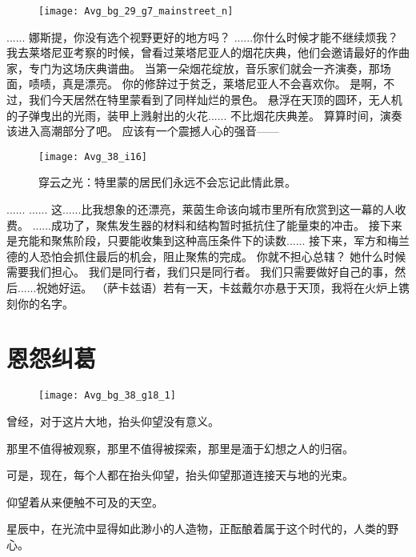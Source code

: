 \documentclass[openany]{book}
\begin{document}
\begin{figure}[h]
    \centering
    \texttt{[image: Avg\_bg\_29\_g7\_mainstreet\_n]}
\end{figure}
\begin{dialogue}
     ......
     娜斯提，你没有选个视野更好的地方吗？
     ......你什么时候才能不继续烦我？
     我去莱塔尼亚考察的时候，曾看过莱塔尼亚人的烟花庆典，他们会邀请最好的作曲家，专门为这场庆典谱曲。
     当第一朵烟花绽放，音乐家们就会一齐演奏，那场面，啧啧，真是漂亮。
     你的修辞过于贫乏，莱塔尼亚人不会喜欢你。
     是啊，不过，我们今天居然在特里蒙看到了同样灿烂的景色。
     悬浮在天顶的圆环，无人机的子弹曳出的光雨，装甲上溅射出的火花......
     不比烟花庆典差。
     算算时间，演奏该进入高潮部分了吧。
     应该有一个震撼人心的强音——
    \begin{figure}[h]
        \caption*{穿云之光：特里蒙的居民们永远不会忘记此情此景。}
        \centering
        \texttt{[image: Avg\_38\_i16]}
    \end{figure}
     ......
     ......
     这......比我想象的还漂亮，莱茵生命该向城市里所有欣赏到这一幕的人收费。
     ......成功了，聚焦发生器的材料和结构暂时抵抗住了能量束的冲击。
     接下来是充能和聚焦阶段，只要能收集到这种高压条件下的读数......
     接下来，军方和梅兰德的人恐怕会抓住最后的机会，阻止聚焦的完成。
     你就不担心总辖？
     她什么时候需要我们担心。
     我们是同行者，我们只是同行者。
     我们只需要做好自己的事，然后......祝她好运。
     （萨卡兹语）若有一天，卡兹戴尔亦悬于天顶，我将在火炉上镌刻你的名字。
\end{dialogue}

\chapter{恩怨纠葛}
\begin{figure}[h]
    \centering
    \texttt{[image: Avg\_bg\_38\_g18\_1]}
\end{figure}
曾经，对于这片大地，抬头仰望没有意义。\par
那里不值得被观察，那里不值得被探索，那里是湎于幻想之人的归宿。\par
可是，现在，每个人都在抬头仰望，抬头仰望那道连接天与地的光束。\par
仰望着从来便触不可及的天空。\par
星辰中，在光流中显得如此渺小的人造物，正酝酿着属于这个时代的，人类的野心。
\end{document}
